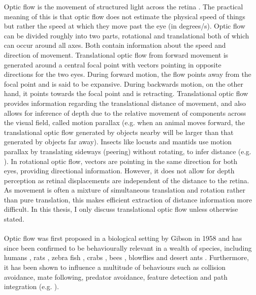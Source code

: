 Optic flow is the movement of structured light across the retina \autocite{Raudies2013}. The practical meaning of this is that optic flow does not estimate the physical speed of things but rather the speed at which they move past the eye (in degrees/s). Optic flow can be divided roughly into two parts, rotational and translational both of which can occur around all axes. Both contain information about the speed and direction of movement. Translational optic flow from forward movement is generated around a central focal point with vectors pointing in opposite directions for the two eyes. During forward motion, the flow points away from the focal point and is said to be expansive. During backwards motion, on the other hand, it points towards the focal point and is retracting. Translational optic flow provides information regarding the translational distance of movement, and also allows for inference of depth due to the relative movement of components across the visual field, called motion parallax (e.g. when an animal moves forward, the translational optic flow generated by objects nearby will be larger than that generated by objects far away). Insects like locusts and mantids use motion parallax by translating sideways (peering) without rotating, to infer distance (e.g. \cite{Sobel1990b}). In rotational optic flow, vectors are pointing in the same direction for both eyes, providing directional information. However, it does not allow for depth perception as retinal displacements are independent of the distance to the retina. As movement is often a mixture of simultaneous translation and rotation rather than pure translation, this makes efficient extraction of distance information more difficult. In this thesis, I only discuss translational optic flow unless otherwise stated.\\ \\
Optic flow was first proposed in a biological setting by Gibson in 1958 \autocite{Gibson1958a} and has since been confirmed to be behaviourally relevant in a wealth of species, including humans \autocite{Warren1988}, rats \autocite{Kautzky2016}, zebra fish \autocite{Wang2019}, crabs \autocite{Horseman2011}, bees \autocite{Linander2015}, blowflies \autocite{Longden2009} and desert ants \autocite{Pfeffer2016}. Furthermore, it has been shown to influence a multitude of behaviours such as collision avoidance, mate following, predator avoidance, feature detection and path integration (e.g. \cite{Srinivasan1996}).

